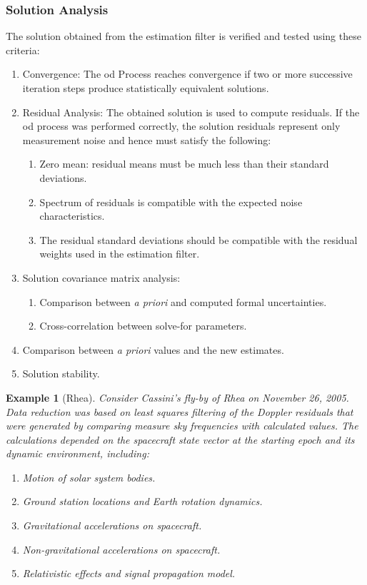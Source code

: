 \documentclass[oneside]{book}
\theoremstyle{mystyle}
\newtheorem{example}{Example}[section]
\begin{document}
\subsubsection{\footnotesize Solution Analysis}

\noindent The solution obtained from the estimation filter is verified and tested using these criteria:
\begin{enumerate}[itemsep=0pt]
\item Convergence: The \gls{od} Process reaches convergence if two or more successive iteration steps produce statistically equivalent solutions.
\item Residual Analysis: The obtained solution is used to compute \glspl{residual}. If the \gls{od} process was performed correctly, the solution \glspl{residual} represent only measurement noise and hence must satisfy the following:
\begin{enumerate}[itemsep=0pt]
\item Zero mean: \Gls{residual} means must be much less than their standard deviations.
\item Spectrum of \glspl{residual} is compatible with the expected noise characteristics.
\item The \gls{residual} standard deviations should be compatible with the \gls{residual} \break weights used in the estimation filter.
\end{enumerate}
\item Solution \gls{covariance matrix} analysis:
\begin{enumerate}[itemsep=0pt]
\item Comparison between \textit{a priori} and computed formal uncertainties.
\item Cross-correlation between \gls{solve-for parameters}.
\end{enumerate}
\item Comparison between \textit{a priori} values and the new estimates.
\item Solution stability.
\end{enumerate}

\begin{example}[Rhea] Consider Cassini's fly-by of Rhea on November 26, 2005. Data reduction was based on least squares filtering of the Doppler residuals that were generated by comparing measure sky frequencies with calculated values. The calculations depended on the spacecraft state vector at the starting epoch and its dynamic environment, including:
\begin{enumerate}[itemsep=0pt]
\item Motion of solar system bodies.
\item Ground station locations and Earth rotation dynamics.
\item Gravitational accelerations on spacecraft.
\item Non-gravitational accelerations on spacecraft.
\item Relativistic effects and signal propagation model.
\end{enumerate}
\end{example}
\end{document}
